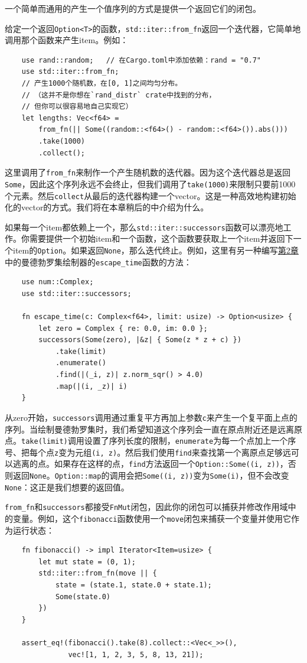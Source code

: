 一个简单而通用的产生一个值序列的方式是提供一个返回它们的闭包。

给定一个返回\texttt{Option<T>}的函数，\texttt{std::iter::from\_fn}返回一个迭代器，它简单地调用那个函数来产生item。例如：
\begin{verbatim}
    use rand::random;   // 在Cargo.toml中添加依赖：rand = "0.7"
    use std::iter::from_fn;
    // 产生1000个随机数，在[0, 1]之间均匀分布。
    // （这并不是你想在`rand_distr` crate中找到的分布，
    // 但你可以很容易地自己实现它）
    let lengths: Vec<f64> =
        from_fn(|| Some((random::<f64>() - random::<f64>()).abs()))
        .take(1000)
        .collect();
\end{verbatim}

这里调用了\texttt{from\_fn}来制作一个产生随机数的迭代器。因为这个迭代器总是返回\texttt{Some}，因此这个序列永远不会终止，但我们调用了\texttt{take(1000)}来限制只要前1000个元素。然后\texttt{collect}从最后的迭代器构建一个vector。这是一种高效地构建初始化的vector的方式。我们将在本章稍后的中介绍为什么。

如果每一个item都依赖上一个，那么\texttt{std::iter::successors}函数可以漂亮地工作。你需要提供一个初始item和一个函数，这个函数要获取上一个item并返回下一个item的\texttt{Option}。如果返回\texttt{None}，那么迭代终止。例如，这里有另一种编写\hyperref[ch02]{第2章}中的曼德勃罗集绘制器的\texttt{escape\_time}函数的方法：
\begin{verbatim}
    use num::Complex;
    use std::iter::successors;

    fn escape_time(c: Complex<f64>, limit: usize) -> Option<usize> {
        let zero = Complex { re: 0.0, im: 0.0 };
        successors(Some(zero), |&z| { Some(z * z + c) })
            .take(limit)
            .enumerate()
            .find(|(_i, z)| z.norm_sqr() > 4.0)
            .map(|(i, _z)| i)
    }
\end{verbatim}

从zero开始，\texttt{successors}调用通过重复平方再加上参数\texttt{c}来产生一个复平面上点的序列。当绘制曼德勃罗集时，我们希望知道这个序列会一直在原点附近还是远离原点。\texttt{take(limit)}调用设置了序列长度的限制，\texttt{enumerate}为每一个点加上一个序号、把每个点\texttt{z}变为元组\texttt{(i, z)}。然后我们使用\texttt{find}来查找第一个离原点足够远可以逃离的点。如果存在这样的点，\texttt{find}方法返回一个\texttt{Option::Some((i, z))}，否则返回\texttt{None}。\texttt{Option::map}的调用会把\texttt{Some((i, z))}变为\texttt{Some(i)}，但不会改变\texttt{None}：这正是我们想要的返回值。

\texttt{from\_fn}和\texttt{successors}都接受\texttt{FnMut}闭包，因此你的闭包可以捕获并修改作用域中的变量。例如，这个\texttt{fibonacci}函数使用一个\texttt{move}闭包来捕获一个变量并使用它作为运行状态：
\begin{verbatim}
    fn fibonacci() -> impl Iterator<Item=usize> {
        let mut state = (0, 1);
        std::iter::from_fn(move || {
            state = (state.1, state.0 + state.1);
            Some(state.0)
        })
    }

    assert_eq!(fibonacci().take(8).collect::<Vec<_>>(),
               vec![1, 1, 2, 3, 5, 8, 13, 21]);
\end{verbatim}

